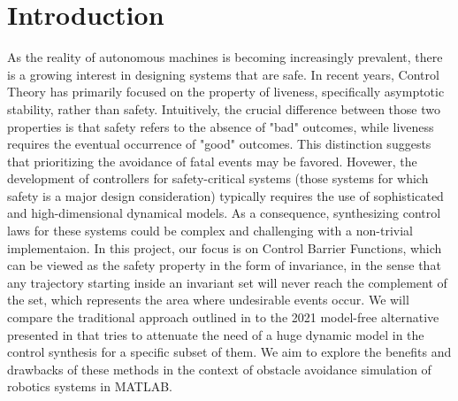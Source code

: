 \section*{Introduction}
As the reality of autonomous machines is becoming increasingly prevalent, there is a growing interest in designing systems that are safe. In recent years, Control Theory has primarily focused on the property of liveness, specifically asymptotic stability, rather than safety.
Intuitively, the crucial difference between those two properties is  that safety refers to the absence of "bad" outcomes, while liveness requires the eventual occurrence of "good" outcomes. This distinction suggests that prioritizing the avoidance of fatal events may be favored.
Hovewer, the development of controllers for safety-critical systems (those systems for which safety is a major design consideration) typically requires the use of sophisticated and high-dimensional dynamical models. As a consequence, synthesizing control laws for these systems could be complex and challenging  with a non-trivial implementaion. 
In this project, our focus is on Control Barrier Functions, which can be viewed as the safety property in the form of invariance, in the sense that any trajectory starting inside an invariant set will never reach the complement of the set, which represents the area where undesirable events occur. 
We will compare the traditional approach outlined in \cite{cbf} to the 2021 model-free alternative presented in \cite{mfcbf} that tries to attenuate the need of a huge dynamic model in the control synthesis for a specific subset of them. We aim to explore the benefits and drawbacks of these methods in the context of obstacle avoidance simulation of robotics systems in MATLAB.


